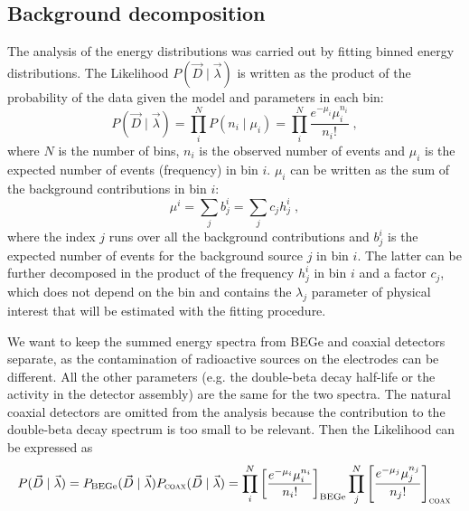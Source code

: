 \subsection*{Background decomposition}
The analysis of the energy distributions was carried out by fitting binned energy distributions. The Likelihood $P(\vec{D}\mid\vec{\lambda})$ is written as the product of the probability of the data given the model and parameters in each bin:
\begin{equation}P(\vec{D}\mid\vec{\lambda})=\prod_i^{N}P(n_i\mid\mu_i)=\prod_i^N\frac{e^{-\mu_i}\mu_i^{n_i}}{n_i!}\;,\end{equation}
where $N$ is the number of bins, $n_i$ is the observed number of events and $\mu_i$ is the expected number of events (frequency) in bin $i$. $\mu_i$ can be written as the sum of the background contributions in bin $i$:
\begin{equation}\mu^i=\sum_jb_j^i=\sum_j c_jh_j^i\;,\end{equation}
where the index $j$ runs over all the background contributions and $b_j^i$ is the expected number of events for the background source $j$ in bin $i$. The latter can be further decomposed in the product of the frequency $h_j^i$ in bin $i$ and a factor $c_j$, which does not depend on the bin and contains the $\lambda_j$ parameter of physical interest that will be estimated with the fitting procedure.

We want to keep the summed energy spectra from BEGe and coaxial detectors separate, as the contamination of radioactive sources on the electrodes can be different. All the other parameters (e.g. the double-beta decay half-life or the  activity in the detector assembly) are the same for the two spectra. The natural coaxial detectors are omitted from the analysis because the contribution to the double-beta decay spectrum is too small to be relevant. Then the Likelihood can be expressed as
\begin{equation}P(\vec{D}\mid\vec{\lambda})=P_\text{BEGe}(\vec{D}\mid\vec{\lambda})P_\textsc{coax}(\vec{D}\mid\vec{\lambda})=\prod_i^N\left[\frac{e^{-\mu_i}\mu_i^{n_i}}{n_i!}\right]_\text{BEGe}\prod_j^N\left[\frac{e^{-\mu_j}\mu_j^{n_j}}{n_j!}\right]_\textsc{coax}\end{equation}

